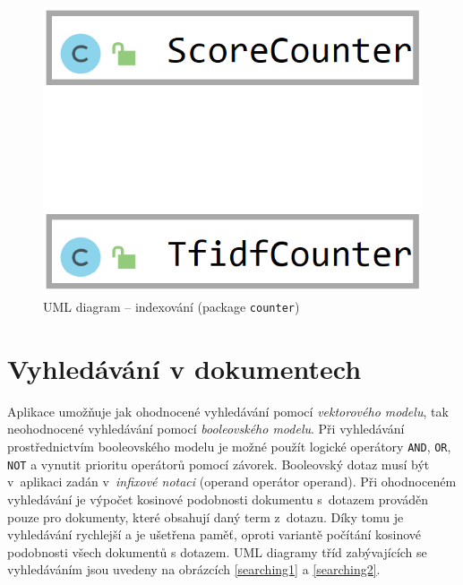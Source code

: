 \documentclass[
11pt,
a4paper,
pdftex,
czech,
titlepage
]{report}
\begin{document}
\begin{figure}[!ht]
	\centering
	\includegraphics[scale=0.20]{img/indexing3.png}
	\caption{UML diagram -- indexování (package \texttt{counter})}
	\label{uml_indexing3}
\end{figure}

\section{Vyhledávání v dokumentech}
Aplikace umožňuje jak ohodnocené vyhledávání pomocí \textit{vektorového modelu}, tak neohodnocené vyhledávání pomocí \textit{booleovského modelu}. Při vyhledávání prostřednictvím booleovského modelu je možné použít logické operátory \texttt{AND}, \texttt{OR}, \texttt{NOT} a vynutit prioritu operátorů pomocí závorek. Booleovský dotaz musí být v~aplikaci zadán v~\textit{infixové notaci} (operand operátor operand). Při ohodnoceném vyhledávání je výpočet kosinové podobnosti dokumentu s~dotazem prováděn pouze pro dokumenty, které obsahují daný term z~dotazu. Díky tomu je vyhledávání rychlejší a je ušetřena paměť, oproti variantě počítání kosinové podobnosti všech dokumentů s dotazem. UML diagramy tříd zabývajících se vyhledáváním jsou uvedeny na obrázcích \ref{searching1} a \ref{searching2}.
\end{document}
